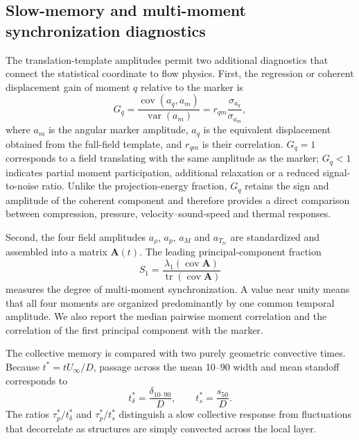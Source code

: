 \documentclass[paper]{JFM-FLM_Au}
\newcommand{\tstar}{t^*}
\newcommand{\scenter}{s_{50}}
\newcommand{\deltaten}{\delta_{10\text{--}90}}
\begin{document}
\subsection{Slow-memory and multi-moment synchronization diagnostics}
The translation-template amplitudes permit two additional diagnostics that connect the statistical coordinate to flow physics. First, the regression or coherent displacement gain of moment $q$ relative to the marker is
\begin{equation}
 G_q=\frac{\operatorname{cov}(a_q,a_m)}{\operatorname{var}(a_m)}
 =r_{qm}\frac{\sigma_{a_q}}{\sigma_{a_m}},
 \label{eq:gain}
\end{equation}
where $a_m$ is the angular marker amplitude, $a_q$ is the equivalent displacement obtained from the full-field template, and $r_{qm}$ is their correlation. $G_q=1$ corresponds to a field translating with the same amplitude as the marker; $G_q<1$ indicates partial moment participation, additional relaxation or a reduced signal-to-noise ratio. Unlike the projection-energy fraction, $G_q$ retains the sign and amplitude of the coherent component and therefore provides a direct comparison between compression, pressure, velocity--sound-speed and thermal responses.

Second, the four field amplitudes $a_\rho$, $a_p$, $a_M$ and $a_{T_{tr}}$ are standardized and assembled into a matrix $\bm A(t)$. The leading principal-component fraction
\begin{equation}
 S_1=\frac{\lambda_1(\operatorname{cov}\bm A)}{\operatorname{tr}(\operatorname{cov}\bm A)}
 \label{eq:synch}
\end{equation}
measures the degree of multi-moment synchronization. A value near unity means that all four moments are organized predominantly by one common temporal amplitude. We also report the median pairwise moment correlation and the correlation of the first principal component with the marker.

The collective memory is compared with two purely geometric convective times. Because $\tstar=tU_\infty/D$, passage across the mean 10--90 width and mean standoff corresponds to
\begin{equation}
 t_\delta^*=\frac{\deltaten}{D},\qquad
 t_s^*=\frac{\scenter}{D}.
 \label{eq:passage}
\end{equation}
The ratios $\tau_p^*/t_\delta^*$ and $\tau_p^*/t_s^*$ distinguish a slow collective response from fluctuations that decorrelate as structures are simply convected across the local layer.
\end{document}
